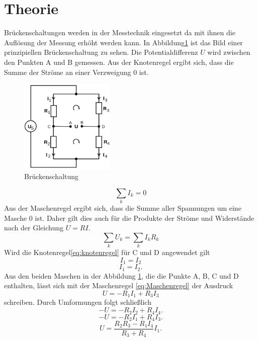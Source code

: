 \section{Theorie}
\label{sec:Theorie}

\cite{sample}
Brückenschaltungen werden in der Messtechnik eingesetzt da mit ihnen die Auflösung
der Messung erhöht werden kann.
In Abbildung\ref{fig:Brueckenschaltung} ist das Bild einer prinzipiellen Brückenschaltung zu sehen.
Die Potentialdifferenz $U$ wird zwischen den Punkten A und B gemessen. Aus der
Knotenregel ergibt sich, dass die Summe der Ströme an einer Verzweigung $0$ ist.
\begin{figure}
  \centering
  \includegraphics[width=0.4\textwidth]{Bilder/Brueckenschaltung.png}
  \caption{Brückenschaltung}
  \label{fig:Brueckenschaltung}
\end{figure}
\begin{equation}
  \sum \limits_{k} I_k= 0
  \label{eq:knotenregel}
\end{equation}
Aus der Maschenregel ergibt sich, dass die Summe aller Spannungen um eine Masche
$0$ ist. Daher gilt dies auch für die Produkte der Ströme und Widerstände nach
der Gleichung $U=RI$.
\begin{equation}
  \sum \limits_{k} U_k=  \sum \limits_{k} I_k R_k
  \label{eq:Maschenregel}
\end{equation}
Wird die Knotenregel\eqref{eq:knotenregel} für C und D angewendet gilt
\begin{equation}
  I_1=I_2
\end{equation}
\begin{equation}
  I_1=I_2    .
\end{equation}
Aus den beiden Maschen in der Abbildung \ref{fig:Brueckenschaltung}, die die Punkte
A, B, C und D enthalten, lässt sich mit der Maschenregel \eqref{eq:Maschenregel}
der Ausdruck
\begin{equation}
  U=-R_1 I_1 + R_3 I_3
\end{equation}
schreiben. Durch Umformungen folgt schließlich
\begin{equation}
  -U=-R_2 I_2 + R_4 I_4   .
\end{equation}
\begin{equation}
  -U=-R_2 I_1 + R_4 I_3   .
\end{equation}
\begin{equation}
  U=\frac{R_2 R_3 - R_1 I_4}{R_3 + R_4}I_1   .
\end{equation}

